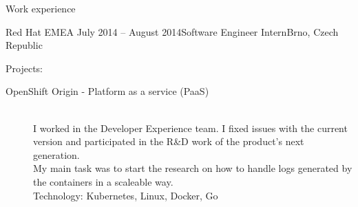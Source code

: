 \documentclass{resume} %
\begin{document}
\begin{rSection}{Work experience}
\begin{rSubsection}{Red Hat EMEA}
{July 2014 – August 2014}{Software Engineer Intern}{Brno, Czech Republic}
\item Projects:
	\begin{description}
		\item[OpenShift Origin - Platform as a service (PaaS)] \hfill \\
		I worked in the Developer Experience team. I fixed issues with the current version
		and participated in the R\&D work of the product's next generation.\\
		My main task was to start the research on how to handle logs generated by the containers
		in a scaleable way. \\
		Technology: Kubernetes, Linux, Docker, Go
	\end{description}
\end{rSubsection}

\newpage


\end{rSection}
\end{document}
